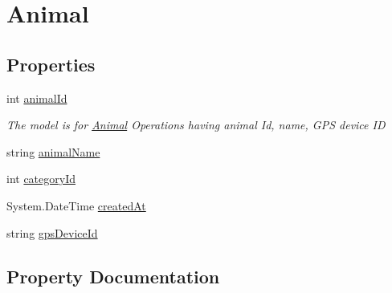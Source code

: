 \hypertarget{classWildLifeTracker_1_1Models_1_1Animal}{}\section{Animal}
\label{classWildLifeTracker_1_1Models_1_1Animal}
\subsection*{Properties}
\begin{DoxyCompactItemize}
\item 
int \hyperlink{classWildLifeTracker_1_1Models_1_1Animal_a99787b9867ae390df467a99040589a55}{animal\+Id}
\begin{DoxyCompactList}\small\item\em The model is for \hyperlink{classWildLifeTracker_1_1Models_1_1Animal}{Animal} Operations having animal Id, name, G\+PS device ID \end{DoxyCompactList}\item 
string \hyperlink{classWildLifeTracker_1_1Models_1_1Animal_afd38ba6641283469fc9e94212467f9a2}{animal\+Name}
\item 
int \hyperlink{classWildLifeTracker_1_1Models_1_1Animal_a423f91c56dc35040d661cfbe357f7c78}{category\+Id}
\item 
System.\+Date\+Time \hyperlink{classWildLifeTracker_1_1Models_1_1Animal_a0da6329d5fbb1b91739557ad49ece9c0}{created\+At}
\item 
string \hyperlink{classWildLifeTracker_1_1Models_1_1Animal_a073b88a9702ca0513fa534f58a048070}{gps\+Device\+Id}
\end{DoxyCompactItemize}


\subsection{Property Documentation}
\mbox{\label{classWildLifeTracker_1_1Models_1_1Animal_a99787b9867ae390df467a99040589a55}} 
